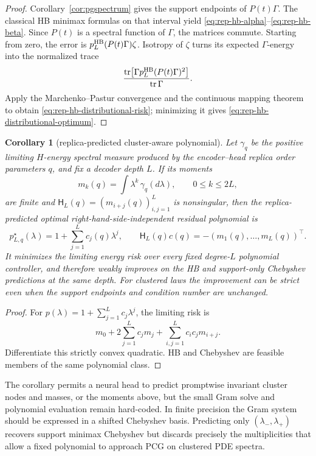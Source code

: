 \documentclass[11pt,a4paper]{article}
\newtheorem{corollary}{Corollary}
\theoremstyle{definition}
\newcommand{\tr}{\operatorname{tr}}
\begin{document}
\begin{proof}
Corollary~\ref{cor:pgspectrum} gives the support endpoints of $P(t)\Gamma$.
The classical HB minimax formulas on that interval yield
\eqref{eq:rep-hb-alpha}--\eqref{eq:rep-hb-beta}.  Since $P(t)$ is a spectral
function of $\Gamma$, the matrices commute.  Starting from zero, the error is
$p_L^{\rm HB}(P(t)\Gamma)\zeta$.  Isotropy of $\zeta$ turns its expected
$\Gamma$-energy into the normalized trace
\[
    \frac{\tr\!\left[
      \Gamma p_L^{\rm HB}(P(t)\Gamma)^2\right]}{\tr\Gamma}.
\]
Apply the Marchenko--Pastur convergence and the continuous mapping theorem to
obtain \eqref{eq:rep-hb-distributional-risk}; minimizing it gives
\eqref{eq:rep-hb-distributional-optimum}.
\end{proof}

\begin{corollary}[replica-predicted cluster-aware polynomial]
\label{cor:replica-moment-polynomial}
Let \(\gamma_q\) be the positive limiting \(H\)-energy spectral measure
produced by the encoder--head replica order parameters \(q\), and fix a
decoder depth \(L\).  If its moments
\[
 m_k(q)=\int\lambda^k\,\gamma_q(d\lambda),
 \qquad 0\leq k\leq2L,
\]
are finite and \(\mathsf H_L(q)=(m_{i+j}(q))_{i,j=1}^L\) is nonsingular,
then the replica-predicted optimal right-hand-side-independent residual
polynomial is
\[
 p_{L,q}^\star(\lambda)
 =1+\sum_{j=1}^Lc_j(q)\lambda^j,
 \qquad
 \mathsf H_L(q)c(q)=-(m_1(q),\ldots,m_L(q))^\top .
 \label{eq:pde-replica-moment-polynomial}
\]
It minimizes the limiting energy risk over every fixed degree-\(L\)
polynomial controller, and therefore weakly improves on the HB and
support-only Chebyshev predictions at the same depth.  For clustered laws the
improvement can be strict even when the support endpoints and condition
number are unchanged.
\end{corollary}
\begin{proof}
For \(p(\lambda)=1+\sum_{j=1}^Lc_j\lambda^j\), the limiting risk is
\[
 m_0+2\sum_{j=1}^Lc_jm_j
 +\sum_{i,j=1}^Lc_ic_jm_{i+j}.
\]
Differentiate this strictly convex quadratic.  HB and Chebyshev are feasible
members of the same polynomial class.
\end{proof}

The corollary permits a neural head to predict promptwise invariant cluster
nodes and masses, or the
moments above, but the small Gram solve and polynomial evaluation remain
hard-coded.  In finite precision the Gram system should be expressed in a
shifted Chebyshev basis.  Predicting only \((\lambda_-,\lambda_+)\) recovers
support minimax Chebyshev but discards precisely the multiplicities that
allow a fixed polynomial to approach PCG on clustered PDE spectra.
\end{document}
